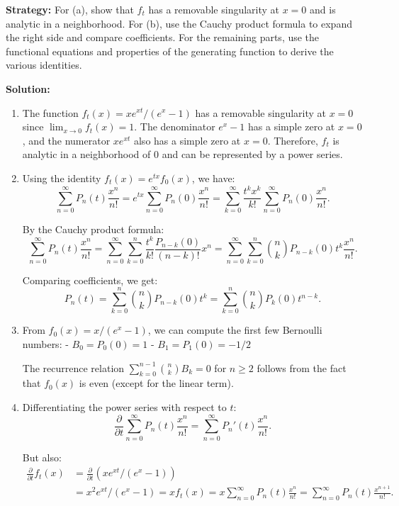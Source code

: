 \noindent\textbf{Strategy:} For (a), show that \( f_t \) has a removable singularity at \( x = 0 \) and is analytic in a neighborhood. For (b), use the Cauchy product formula to expand the right side and compare coefficients. For the remaining parts, use the functional equations and properties of the generating function to derive the various identities.

\bigskip\noindent\textbf{Solution:}
\begin{enumerate}[label=(\alph*)]
\item The function \( f_t(x) = xe^{xt}/(e^x - 1) \) has a removable singularity at \( x = 0 \) since \( \lim_{x \to 0} f_t(x) = 1 \). The denominator \( e^x - 1 \) has a simple zero at \( x = 0 \), and the numerator \( xe^{xt} \) also has a simple zero at \( x = 0 \). Therefore, \( f_t \) is analytic in a neighborhood of 0 and can be represented by a power series.

\item Using the identity \( f_t(x) = e^{tx} f_0(x) \), we have:
\[\sum_{n=0}^\infty P_n(t) \frac{x^n}{n!} = e^{tx} \sum_{n=0}^\infty P_n(0) \frac{x^n}{n!} = \sum_{k=0}^\infty \frac{t^k x^k}{k!} \sum_{n=0}^\infty P_n(0) \frac{x^n}{n!}.\]

By the Cauchy product formula:
\[\sum_{n=0}^\infty P_n(t) \frac{x^n}{n!} = \sum_{n=0}^\infty \sum_{k=0}^n \frac{t^k}{k!} \frac{P_{n-k}(0)}{(n-k)!} x^n = \sum_{n=0}^\infty \sum_{k=0}^n \binom{n}{k} P_{n-k}(0) t^k \frac{x^n}{n!}.\]

Comparing coefficients, we get:
\[P_n(t) = \sum_{k=0}^n \binom{n}{k} P_{n-k}(0) t^k = \sum_{k=0}^n \binom{n}{k} P_k(0) t^{n-k}.\]

\item From \( f_0(x) = x/(e^x - 1) \), we can compute the first few Bernoulli numbers:
- \( B_0 = P_0(0) = 1 \)
- \( B_1 = P_1(0) = -1/2 \)

The recurrence relation \( \sum_{k=0}^{n-1} \binom{n}{k} B_k = 0 \) for \( n \geq 2 \) follows from the fact that \( f_0(x) \) is even (except for the linear term).

\item Differentiating the power series with respect to \( t \):
\[\frac{\partial}{\partial t} \sum_{n=0}^\infty P_n(t) \frac{x^n}{n!} = \sum_{n=0}^\infty P_n'(t) \frac{x^n}{n!}.\]

But also:
\begin{align*}
\frac{\partial}{\partial t} f_t(x) &= \frac{\partial}{\partial t} (xe^{xt}/(e^x - 1)) \\
&= x^2 e^{xt}/(e^x - 1) = x f_t(x) = x \sum_{n=0}^\infty P_n(t) \frac{x^n}{n!} = \sum_{n=0}^\infty P_n(t) \frac{x^{n+1}}{n!}.
\end{align*}


\end{enumerate}
